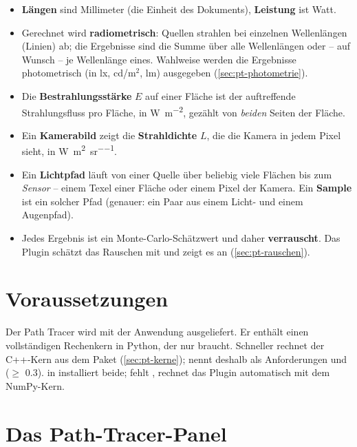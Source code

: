 \begin{itemize}
  \item \textbf{Längen} sind Millimeter (die Einheit des Dokuments), \textbf{Leistung} ist Watt.
  \item Gerechnet wird \textbf{radiometrisch}: Quellen strahlen bei einzelnen Wellenlängen
    (Linien) ab; die Ergebnisse sind die Summe über alle Wellenlängen oder -- auf Wunsch -- je
    Wellenlänge eines. Wahlweise werden die Ergebnisse photometrisch (in lx, cd/m$^2$, lm)
    ausgegeben (\autoref{sec:pt-photometrie}).
  \item Die \textbf{Bestrahlungsstärke} $E$ auf einer Fläche ist der auftreffende Strahlungsfluss
    pro Fläche, in \si{\watt\per\square\metre}, gezählt von \emph{beiden} Seiten der Fläche.
  \item Ein \textbf{Kamerabild} zeigt die \textbf{Strahldichte} $L$, die die Kamera in jedem Pixel
    sieht, in \si{\watt\per\square\metre\per\steradian}.
  \item Ein \textbf{Lichtpfad} läuft von einer Quelle über beliebig viele Flächen bis zum
    \emph{Sensor} -- einem Texel einer Fläche oder einem Pixel der Kamera. Ein \textbf{Sample} ist
    ein solcher Pfad (genauer: ein Paar aus einem Licht- und einem Augenpfad).
  \item Jedes Ergebnis ist ein Monte-Carlo-Schätzwert und daher \textbf{verrauscht}. Das Plugin
    schätzt das Rauschen mit und zeigt es an (\autoref{sec:pt-rauschen}).
\end{itemize}

\section{Voraussetzungen}\label{sec:pt-voraussetzungen}

Der Path Tracer wird mit der Anwendung ausgeliefert. Er enthält einen vollständigen Rechenkern in
Python, der nur  braucht. Schneller rechnet der C++-Kern aus dem Paket
 (\autoref{sec:pt-kerne});  nennt deshalb als Anforderungen
 und  ($\geq$ 0.3).  in
 installiert beide; fehlt , rechnet das Plugin
automatisch mit dem NumPy-Kern.

\section{Das Path-Tracer-Panel}\label{sec:pt-panel}

